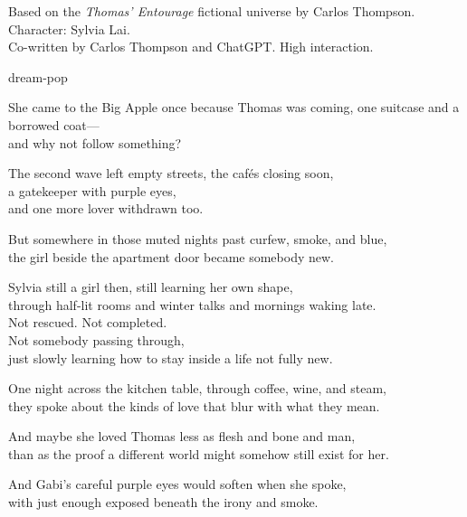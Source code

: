 

\begin{notes}
Based on the \emph{Thomas’ Entourage} fictional universe by Carlos Thompson.\\
Character: Sylvia Lai.\\
Co-written by Carlos Thompson and ChatGPT. %
High interaction.
\end{notes}

\begin{style}
dream-pop
\end{style}

\begin{lyrics}

She came to the Big Apple once because Thomas was coming, one suitcase and a borrowed coat—\\
and why not follow something?

The second wave left empty streets, the cafés closing soon,\\
a gatekeeper with purple eyes,\\
and one more lover withdrawn too.

But somewhere in those muted nights past curfew, smoke, and blue,\\
the girl beside the apartment door became somebody new.

Sylvia still a girl then, still learning her own shape,\\
through half-lit rooms and winter talks and mornings waking late.\\
Not rescued. %
Not completed.\\
Not somebody passing through,\\
just slowly learning how to stay inside a life not fully new.

One night across the kitchen table, through coffee, wine, and steam,\\
they spoke about the kinds of love that blur with what they mean.

And maybe she loved Thomas less as flesh and bone and man,\\
than as the proof a different world might somehow still exist for her.

And Gabi’s careful purple eyes would soften when she spoke,\\
with just enough exposed beneath the irony and smoke.


\end{lyrics}
